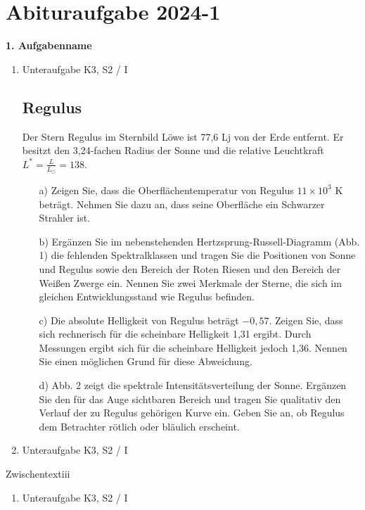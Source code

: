 \chapter{Abituraufgabe 2024-1}\label{Denk}

\begin{aufgabe}
	\textbf{1. Aufgabenname}
	\begin{enumerate}
		\item Unteraufgabe \hfill K3, S2 / I
  \section*{Regulus}

Der Stern Regulus im Sternbild Löwe ist 77,6 Lj von der Erde entfernt. Er besitzt den 3,24-fachen Radius der Sonne und die relative Leuchtkraft $L^* = \frac{L}{L_\odot} = 138$.

\begin{enumerate}
    \item[a)] Zeigen Sie, dass die Oberflächentemperatur von Regulus $11 \times 10^3$ K beträgt. Nehmen Sie dazu an, dass seine Oberfläche ein Schwarzer Strahler ist.

    \item[b)] Ergänzen Sie im nebenstehenden Hertzsprung-Russell-Diagramm (Abb. 1) die fehlenden Spektralklassen und tragen Sie die Positionen von Sonne und Regulus sowie den Bereich der Roten Riesen und den Bereich der Weißen Zwerge ein. Nennen Sie zwei Merkmale der Sterne, die sich im gleichen Entwicklungsstand wie Regulus befinden.

    \item[c)] Die absolute Helligkeit von Regulus beträgt $-0,57$. Zeigen Sie, dass sich rechnerisch für die scheinbare Helligkeit 1,31 ergibt. Durch Messungen ergibt sich für die scheinbare Helligkeit jedoch 1,36. Nennen Sie einen möglichen Grund für diese Abweichung.

    \item[d)] Abb. 2 zeigt die spektrale Intensitätsverteilung der Sonne. Ergänzen Sie den für das Auge sichtbaren Bereich und tragen Sie qualitativ den Verlauf der zu Regulus gehörigen Kurve ein. Geben Sie an, ob Regulus dem Betrachter rötlich oder bläulich erscheint.
\end{enumerate}
		\item Unteraufgabe \hfill K3, S2 / I
	\end{enumerate}
	Zwischentextiii
	\begin{enumerate}[resume]
		\item Unteraufgabe \hfill K3, S2 / I

\end{enumerate}
\end{aufgabe}
